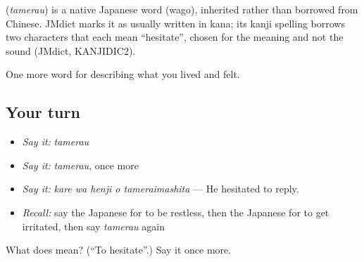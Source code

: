 \begin{cousinweb}
\textbf{} (\emph{tamerau}) is a native Japanese word (wago), inherited rather than borrowed from Chinese. JMdict marks it as usually written in kana; its kanji spelling borrows two characters that each mean \textquotedblleft{}hesitate\textquotedblright{}, chosen for the meaning and not the sound (JMdict, KANJIDIC2).
\end{cousinweb}

\begin{grammarlens}[title={What you've built}]
One more word for describing what you lived and felt.
\end{grammarlens}

\subsection*{Your turn}
\begin{itemize}
\raggedright
  \item \emph{Say it:} \emph{tamerau}
  \item \emph{Say it:} \emph{tamerau}, once more
  \item \emph{Say it:} \emph{kare wa henji o tameraimashita} — He hesitated to reply.
  \item \emph{Recall:} say the Japanese for to be restless, then the Japanese for to get irritated, then say \emph{tamerau} again
\end{itemize}

\begin{tcolorbox}[breakable,colback=teal!4,colframe=teal!35!black,title={Before you move on}]
What does  mean? (\textquotedblleft{}To hesitate\textquotedblright{}.) Say it once more.
\end{tcolorbox}
